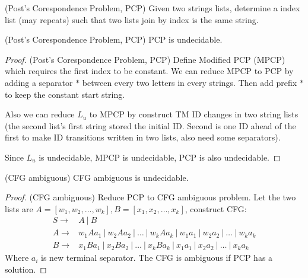         \begin{definition}
            (Post's Corespondence Problem, PCP) Given two strings lists, determine a index list (may repeats) such that two lists join by index is the same string.
        \end{definition}
        \begin{theorem}
            (Post's Corespondence Problem, PCP) PCP is undecidable.
        \end{theorem}
        \begin{proof}
            (Post's Corespondence Problem, PCP) Define Modified PCP (MPCP) which requires the first index to be constant. We can reduce MPCP to PCP by adding a separator $*$ between every two letters in every strings. Then add prefix $*$ to keep the constant start string.

            Also we can reduce $L_{u}$ to MPCP by construct TM ID changes in two string lists (the second list's first string stored the initial ID. Second is one ID ahead of the first to make ID transitions written in two lists, also need some separators).

            Since $L_{u}$ is undecidable, MPCP is undecidable, PCP is also undecidable.
        \end{proof}
        \begin{theorem}
            (CFG ambiguous) CFG ambiguous is undecidable.
        \end{theorem}
        \begin{proof}
            (CFG ambiguous) Reduce PCP to CFG ambiguous problem. Let the two lists are $A=[w_1,w_2,\ldots,w_{k}],B=[x_1,x_2,\ldots,x_{k}]$, construct CFG:
            \begin{align}
                S\rightarrow & A\ |\ B\nonumber\\
                A\rightarrow & w_1Aa_1\ |\ w_2Aa_2\ |\ \ldots\ |\ w_{k}Aa_{k}\ |\ w_1a_1\ |\ w_2a_2\ |\ \ldots\ |\ w_{k}a_{k}\nonumber\\
                B\rightarrow & x_1Ba_1\ |\ x_2Ba_2\ |\ \ldots\ |\ x_{k}Ba_{k}\ |\ x_1a_1\ |\ x_2a_2\ |\ \ldots\ |\ x_{k}a_{k}\nonumber
            \end{align}
            Where $a_{i}$ is new terminal separator. The CFG is ambiguous if PCP has a solution.
        \end{proof}
